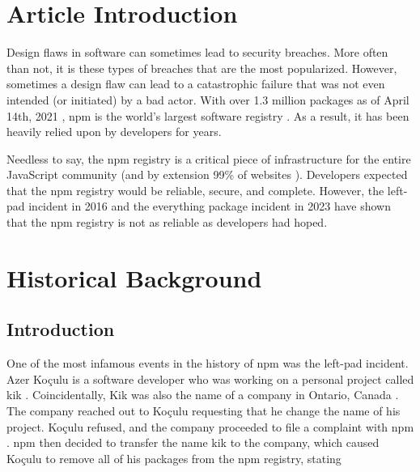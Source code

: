 \documentclass[acmsmall]{acmart}
\begin{document}

\maketitle

\fancyfoot{}
\thispagestyle{empty}

\section{Article Introduction}
Design flaws in software can sometimes lead to security breaches. More often than
not, it is these types of breaches that are the most popularized. However, sometimes
a design flaw can lead to a catastrophic failure that was not even intended
(or initiated) by a bad actor.
With over 1.3 million packages as of April 14th, 2021 \cite{npmblog-stats}, npm is
the world's largest software registry \cite{aboutnpm,w3schools}. As a
result, it has been heavily relied upon by developers for years.

Needless to say, the npm registry is a critical piece of infrastructure for the
entire JavaScript community (and by extension 99\% of websites \cite{w3techs}). Developers
expected that the npm registry would be reliable, secure, and complete. However, the
left-pad incident in 2016 \cite{npmblog-leftpad} and the everything package incident
in 2023 \cite{youtube-everything} have shown that the npm registry is not as reliable
as developers had hoped.

\section{Historical Background}
\subsection{Introduction}
One of the most infamous events in the history of npm was the left-pad incident.
Azer Koçulu is a software developer who was working on a personal project called
kik \cite{qz}. Coincidentally, Kik was also the name of a company in
Ontario, Canada \cite{qz, crunchbase}. The company reached out to Koçulu
requesting that he change the name of his project. Koçulu refused, and the company
proceeded to file a complaint with npm \cite{qz}. npm then decided to transfer the name
kik to the company, which caused Koçulu to remove all of his packages from the
npm registry, stating
\end{document}
